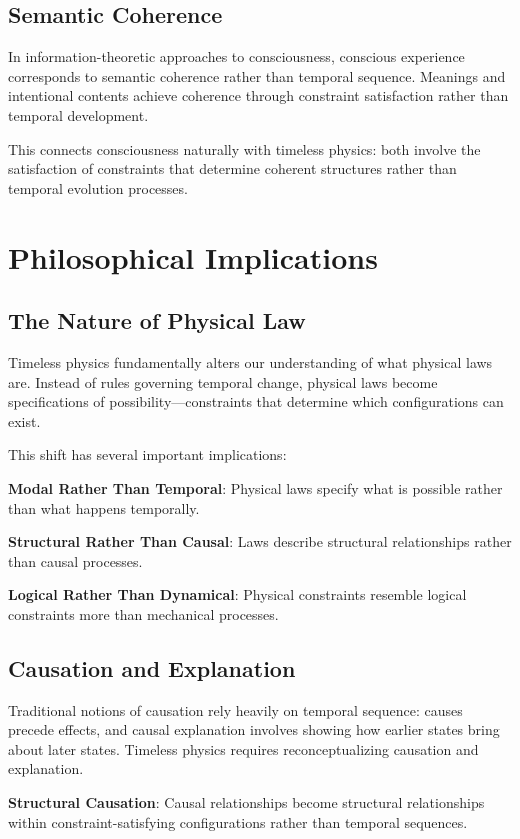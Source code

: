 \documentclass[12pt]{article}
\begin{document}
\subsection{Semantic Coherence}

In information-theoretic approaches to consciousness, conscious experience corresponds to semantic coherence rather than temporal sequence. Meanings and intentional contents achieve coherence through constraint satisfaction rather than temporal development.

This connects consciousness naturally with timeless physics: both involve the satisfaction of constraints that determine coherent structures rather than temporal evolution processes.

\section{Philosophical Implications}

\subsection{The Nature of Physical Law}

Timeless physics fundamentally alters our understanding of what physical laws are. Instead of rules governing temporal change, physical laws become specifications of possibility—constraints that determine which configurations can exist.

This shift has several important implications:

\textbf{Modal Rather Than Temporal}: Physical laws specify what is possible rather than what happens temporally.

\textbf{Structural Rather Than Causal}: Laws describe structural relationships rather than causal processes.

\textbf{Logical Rather Than Dynamical}: Physical constraints resemble logical constraints more than mechanical processes.

\subsection{Causation and Explanation}

Traditional notions of causation rely heavily on temporal sequence: causes precede effects, and causal explanation involves showing how earlier states bring about later states. Timeless physics requires reconceptualizing causation and explanation.

\textbf{Structural Causation}: Causal relationships become structural relationships within constraint-satisfying configurations rather than temporal sequences.
\end{document}
